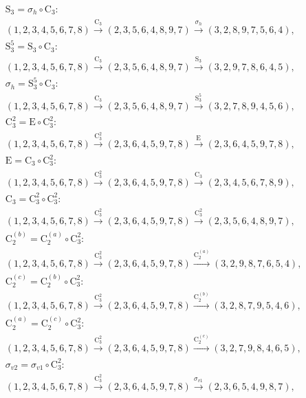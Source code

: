 \begin{align*}
& \mathrm{S}_{3} = \sigma_{h} \circ \mathrm{C}_{3}:\; \\& (1,2,3,4,5,6,7,8) \xrightarrow{\mathrm{C}_{3}} (2,3,5,6,4,8,9,7) \xrightarrow{\sigma_{h}} (3,2,8,9,7,5,6,4), \\
& \mathrm{S}_{3}^{5} = \mathrm{S}_{3} \circ \mathrm{C}_{3}:\; \\& (1,2,3,4,5,6,7,8) \xrightarrow{\mathrm{C}_{3}} (2,3,5,6,4,8,9,7) \xrightarrow{\mathrm{S}_{3}} (3,2,9,7,8,6,4,5), \\
& \sigma_{h} = \mathrm{S}_{3}^{5} \circ \mathrm{C}_{3}:\; \\& (1,2,3,4,5,6,7,8) \xrightarrow{\mathrm{C}_{3}} (2,3,5,6,4,8,9,7) \xrightarrow{\mathrm{S}_{3}^{5}} (3,2,7,8,9,4,5,6), \\
& \mathrm{C}_{3}^{2} = \mathrm{E} \circ \mathrm{C}_{3}^{2}:\; \\& (1,2,3,4,5,6,7,8) \xrightarrow{\mathrm{C}_{3}^{2}} (2,3,6,4,5,9,7,8) \xrightarrow{\mathrm{E}} (2,3,6,4,5,9,7,8), \\
& \mathrm{E} = \mathrm{C}_{3} \circ \mathrm{C}_{3}^{2}:\; \\& (1,2,3,4,5,6,7,8) \xrightarrow{\mathrm{C}_{3}^{2}} (2,3,6,4,5,9,7,8) \xrightarrow{\mathrm{C}_{3}} (2,3,4,5,6,7,8,9), \\
& \mathrm{C}_{3} = \mathrm{C}_{3}^{2} \circ \mathrm{C}_{3}^{2}:\; \\& (1,2,3,4,5,6,7,8) \xrightarrow{\mathrm{C}_{3}^{2}} (2,3,6,4,5,9,7,8) \xrightarrow{\mathrm{C}_{3}^{2}} (2,3,5,6,4,8,9,7), \\
& \mathrm{C}_{2}^{(b)} = \mathrm{C}_{2}^{(a)} \circ \mathrm{C}_{3}^{2}:\; \\& (1,2,3,4,5,6,7,8) \xrightarrow{\mathrm{C}_{3}^{2}} (2,3,6,4,5,9,7,8) \xrightarrow{\mathrm{C}_{2}^{(a)}} (3,2,9,8,7,6,5,4), \\
& \mathrm{C}_{2}^{(c)} = \mathrm{C}_{2}^{(b)} \circ \mathrm{C}_{3}^{2}:\; \\& (1,2,3,4,5,6,7,8) \xrightarrow{\mathrm{C}_{3}^{2}} (2,3,6,4,5,9,7,8) \xrightarrow{\mathrm{C}_{2}^{(b)}} (3,2,8,7,9,5,4,6), \\
& \mathrm{C}_{2}^{(a)} = \mathrm{C}_{2}^{(c)} \circ \mathrm{C}_{3}^{2}:\; \\& (1,2,3,4,5,6,7,8) \xrightarrow{\mathrm{C}_{3}^{2}} (2,3,6,4,5,9,7,8) \xrightarrow{\mathrm{C}_{2}^{(c)}} (3,2,7,9,8,4,6,5), \\
& \sigma_{v2} = \sigma_{v1} \circ \mathrm{C}_{3}^{2}:\; \\& (1,2,3,4,5,6,7,8) \xrightarrow{\mathrm{C}_{3}^{2}} (2,3,6,4,5,9,7,8) \xrightarrow{\sigma_{v1}} (2,3,6,5,4,9,8,7), \\

\end{align*}
